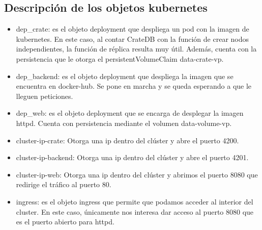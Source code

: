 \documentclass[12pt]{article}
\begin{document}
\subsection[1]{Descripción de los objetos kubernetes}
\begin{itemize}
  \item dep\_crate: es el objeto deployment que despliega un pod con la imagen de kubernetes. En este 
        caso, al contar CrateDB con la función de crear nodos independientes, la función de réplica resulta muy útil.
        Además, cuenta con la persistencia que le otorga el persistentVolumeClaim data-crate-vp.
  \item dep\_backend: es el objeto deployment que despliega la imagen que se encuentra en docker-hub.
        Se pone en marcha y se queda esperando a que le lleguen peticiones.
  \item dep\_web: es el objeto deployment que se encarga de desplegar la imagen httpd. Cuenta con persistencia
        mediante el volumen data-volume-vp. 
  \item cluster-ip-crate: Otorga una ip dentro del clúster y abre el puerto 4200.
  \item cluster-ip-backend: Otorga una ip dentro del clúster y abre el puerto 4201.
  \item cluster-ip-web: Otorga una ip dentro del clúster y abrimos el puerto 8080 que redirige el tráfico
        al puerto 80.
  \item ingress: es el objeto ingress que permite que podamos acceder al interior del cluster. En este caso,
        únicamente nos interesa dar acceso al puerto 8080 que es el puerto abierto para httpd.
\end{itemize}
\end{document}
